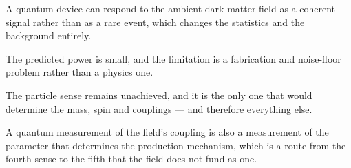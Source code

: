 \begin{keytakeaways}
\item A quantum device can respond to the ambient dark matter field as a
coherent signal rather than as a rare event, which changes the statistics and
the background entirely.
\item The predicted power is small, and the limitation is a fabrication and
noise-floor problem rather than a physics one.
\item The particle sense remains unachieved, and it is the only one that
would determine the mass, spin and couplings --- and therefore everything
else.
\item A quantum measurement of the field's coupling is also a measurement of
the parameter that determines the production mechanism, which is a route
from the fourth sense to the fifth that the field does not fund as one.
\end{keytakeaways}
